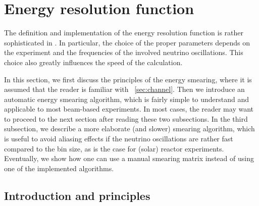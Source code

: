 \section{Energy resolution function}
\label{sec:energy}

The definition and implementation of the energy resolution function is 
rather sophisticated in \GLOBES . In particular, the choice of the 
proper parameters depends on the experiment and the frequencies of the
 involved neutrino oscillations. This choice also greatly influences the
speed of the calculation.

In this section, we first discuss the principles of the energy smearing, where it is assumed that the reader is familiar with \Sec~\ref{sec:channel}. Then we introduce an automatic energy smearing algorithm, which is fairly simple to understand and applicable to most beam-based experiments. 
In most cases, the reader may want to proceed to the next section after reading these two subsections. In the third subsection, we describe a more elaborate (and slower) smearing algorithm, which is useful to avoid aliasing effects if the neutrino oscillations are rather fast compared to the bin size, as is the case for
(solar) reactor experiments. Eventually, we show how one can use a manual smearing matrix instead of using one of the implemented algorithms.

\subsection{Introduction and principles}

